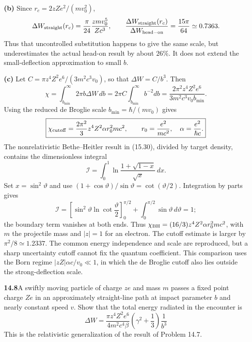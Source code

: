 \textbf{(b)} Since $r_c=2zZe^2/(mv_0^2)$,
\[
\Delta W_{\rm straight}(r_c)=\frac\pi{24}\frac{zmv_0^5}{Zc^3},\qquad
\frac{\Delta W_{\rm straight}(r_c)}{\Delta W_{\rm head-on}}
=\frac{15\pi}{64}\simeq0.7363.
\]
Thus that uncontrolled substitution happens to give the same scale, but
underestimates the actual head-on result by about $26\%$. It does not
extend the small-deflection approximation to small $b$.

\textbf{(c)} Let $C=\pi z^4Z^2e^6/(3m^2c^3v_0)$, so that
$\Delta W=C/b^3$. Then
\[
\chi=\int_{b_{\min}}^\infty2\pi b\Delta W\,db
=2\pi C\int_{b_{\min}}^\infty b^{-2}db
=\frac{2\pi^2z^4Z^2e^6}{3m^2c^3v_0b_{\min}}.
\]
Using the reduced de Broglie scale $b_{\min}=\hbar/(mv_0)$ gives
\[
\boxed{\chi_{\rm cutoff}=\frac{2\pi^2}{3}
 z^4Z^2\alpha r_0^2mc^2,\qquad r_0=\frac{e^2}{mc^2},\quad
\alpha=\frac{e^2}{\hbar c}.}
\]
The nonrelativistic Bethe--Heitler result in (15.30), divided by target
density, contains the dimensionless integral
\[
\mathcal I=\int_0^1\ln\frac{1+\sqrt{1-x}}{\sqrt x}\,dx.
\]
Set $x=\sin^2\vartheta$ and use
$(1+\cos\vartheta)/\sin\vartheta=\cot(\vartheta/2)$.
Integration by parts gives
\[
\mathcal I=
\left[\sin^2\vartheta\ln\cot\frac{\vartheta}{2}\right]_0^{\pi/2}
+\int_0^{\pi/2}\sin\vartheta\,d\vartheta=1;
\]
the boundary term vanishes at both ends.
Thus $\chi_{\rm BH}=(16/3)z^4Z^2\alpha r_0^2mc^2$,
with $m$ the projectile mass and $|z|=1$ for an electron.
The cutoff estimate is larger by $\pi^2/8\simeq1.2337$.
The common energy independence and scale are reproduced, but a sharp
uncertainty cutoff cannot fix the quantum coefficient. This comparison
uses the Born regime $|zZ|\alpha c/v_0\ll1$, in which the de Broglie
cutoff also lies outside the strong-deflection scale.

\par\bigskip
\noindent\textbf{14.8}\quad A swiftly moving particle of charge $ze$ and mass $m$ passes a fixed point charge $Ze$ in an approximately straight-line path at impact parameter $b$ and nearly constant speed $v$. Show that the total energy radiated in the encounter is
\[
\Delta W=\frac{\pi z^{4}Z^{2}e^{6}}{4m^{2}c^{4}\beta}\left(\gamma^{2}+\frac{1}{3}\right)\!\frac{1}{b^{3}}
\]
This is the relativistic generalization of the result of Problem 14.7.
\solution

